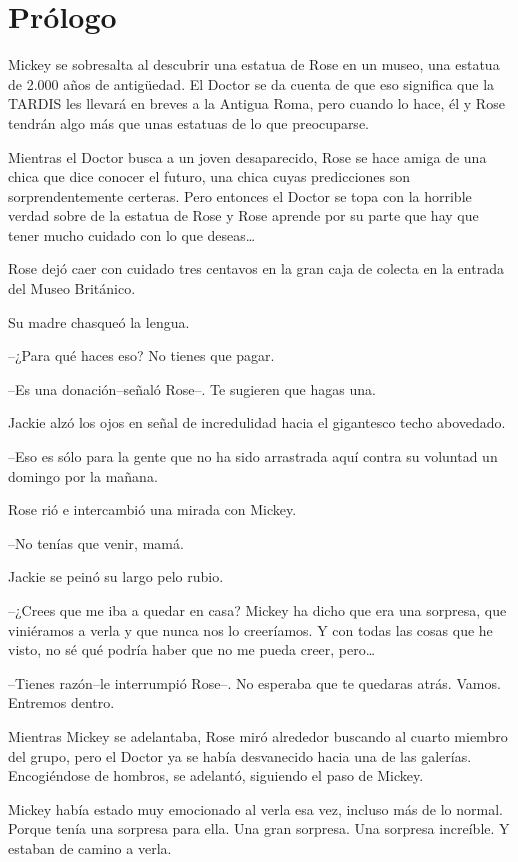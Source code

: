 \chapter*{Prólogo}

Mickey se sobresalta al descubrir una estatua de Rose en un museo, una
estatua de 2.000 años de antigüedad. El Doctor se da cuenta de que eso
significa que la TARDIS les llevará en breves a la Antigua Roma, pero
cuando lo hace, él y Rose tendrán algo más que unas estatuas de lo que
preocuparse.

Mientras el Doctor busca a un joven desaparecido, Rose se hace amiga de
una chica que dice conocer el futuro, una chica cuyas predicciones son
sorprendentemente certeras. Pero entonces el Doctor se topa con la
horrible verdad sobre de la estatua de Rose y Rose aprende por su parte
que hay que tener mucho cuidado con lo que deseas\ldots{}

Rose dejó caer con cuidado tres centavos en la gran caja de colecta en
la entrada del Museo Británico.

Su madre chasqueó la lengua.

--¿Para qué haces eso? No tienes que pagar.

--Es una donación--señaló Rose--. Te sugieren que hagas una.

Jackie alzó los ojos en señal de incredulidad hacia el gigantesco techo
abovedado.

--Eso es sólo para la gente que no ha sido arrastrada aquí contra su
voluntad un domingo por la mañana.

Rose rió e intercambió una mirada con Mickey.

--No tenías que venir, mamá.

Jackie se peinó su largo pelo rubio.

--¿Crees que me iba a quedar en casa? Mickey ha dicho que era una
sorpresa, que viniéramos a verla y que nunca nos lo creeríamos. Y con
todas las cosas que he visto, no sé qué podría haber que no me pueda
creer, pero\ldots{}

--Tienes razón--le interrumpió Rose--. No esperaba que te quedaras
atrás. Vamos. Entremos dentro.

Mientras Mickey se adelantaba, Rose miró alrededor buscando al cuarto
miembro del grupo, pero el Doctor ya se había desvanecido hacia una de
las galerías. Encogiéndose de hombros, se adelantó, siguiendo el paso de
Mickey.

Mickey había estado muy emocionado al verla esa vez, incluso más de lo
normal. Porque tenía una sorpresa para ella. Una gran sorpresa. Una
sorpresa increíble. Y estaban de camino a verla.

